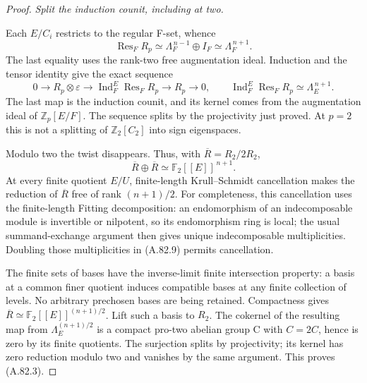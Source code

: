 \begin{proof}
\emph{Split the induction counit, including at two.}\par
Each \(E/C_i\) restricts to the regular F-set, whence
\[
 \operatorname{Res}_F R_p
       \simeq\Lambda_F^{\,n-1}\oplus I_F
       \simeq\Lambda_F^{\,n+1}.
 \tag{A.82.7}
\]
The last equality uses the rank-two free augmentation ideal.
Induction and the tensor identity give the exact sequence
\[
 0\longrightarrow R_p\otimes\varepsilon
  \longrightarrow\operatorname{Ind}_F^E\operatorname{Res}_F R_p
  \longrightarrow R_p\longrightarrow0,
 \qquad
 \operatorname{Ind}_F^E\operatorname{Res}_F R_p
       \simeq\Lambda_E^{\,n+1}.
 \tag{A.82.8}
\]
The last map is the induction counit, and its kernel comes
from the augmentation ideal of \(\mathbb Z_p[E/F]\).
The sequence splits by the projectivity just proved.
At \(p=2\) this is not a splitting of
\(\mathbb Z_2[C_2]\) into sign eigenspaces.

Modulo two the twist disappears. Thus, with
\(\overline R=R_2/2R_2\),
\[
             \overline R\oplus\overline R
                     \simeq\mathbb F_2[[E]]^{\,n+1}.
 \tag{A.82.9}
\]
At every finite quotient \(E/U\), finite-length
Krull--Schmidt cancellation makes the reduction of
\(\overline R\) free of rank \((n+1)/2\).
For completeness, this cancellation uses the finite-length
Fitting decomposition: an endomorphism of an indecomposable
module is invertible or nilpotent, so its endomorphism ring
is local; the usual summand-exchange argument then gives
unique indecomposable multiplicities. Doubling those
multiplicities in (A.82.9) permits cancellation.

The finite sets of bases have the inverse-limit finite
intersection property: a basis at a common finer quotient
induces compatible bases at any finite collection of levels.
No arbitrary prechosen bases are being retained. Compactness
gives \(\overline R\simeq\mathbb F_2[[E]]^{(n+1)/2}\).
Lift such a basis to \(R_2\). The cokernel of the resulting
map from \(\Lambda_E^{(n+1)/2}\) is a compact pro-two
abelian group C with \(C=2C\), hence is zero by its finite
quotients. The surjection splits by projectivity; its kernel
has zero reduction modulo two and vanishes by the same
argument. This proves (A.82.3).
\end{proof}

